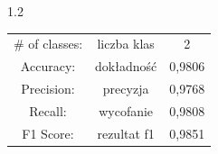 \documentclass[a4paper,12pt]{article}
\newcommand\spacingInSolemnItemize{1.2}
\begin{document}
                
		
		    
		
            \begin{spacing}{\spacingInSolemnItemize}
		    \begin{center}
                \begin{tabular}{c c c }
                    \# of classes: & liczba klas & 2 \\
                    Accuracy:  & dokładność &0,9806  \\ 
                    Precision:  & precyzja & 0,9768 \\  
                    Recall: & wycofanie & 0,9808      \\
                    F1 Score: & rezultat f1 & 0,9851
                \end{tabular}
            \end{center}
		    \end{spacing}

            
		
\end{document}
